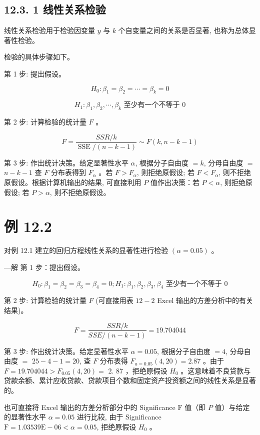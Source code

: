 \documentclass[10pt]{article}
\begin{document}
\begin{CJK*}{UTF8}{bsmi}
\subsection*{12.3. 1 线性关系检验}
线性关系检验用于检验因变量 $y$ 与 $k$ 个自变量之间的关系是否显著, 也称为总体显著性检验。

检验的具体步骤如下。

第 1 步: 提出假设。

$$
H_{0}: \beta_{1}=\beta_{2}=\cdots=\beta_{k}=0
$$

$$
H_{1}: \beta_{1}, \beta_{2}, \cdots, \beta_{k} \text { 至少有一个不等于 } 0
$$

第 2 步: 计算检验的统计量 $F$ 。


\begin{equation*}
F=\frac{S S R / k}{\operatorname{SSE} /(n-k-1)} \sim F(k, n-k-1) \tag{12.10}
\end{equation*}


第 3 步: 作出统计决策。给定显著性水平 $\alpha$, 根据分子自由度 $=k$, 分母自由度 $=$ $n-k-1$ 查 $F$ 分布表得到 $F_{\alpha}$ 。若 $F>F_{\alpha}$, 则拒绝原假设; 若 $F<F_{\alpha}$, 则不拒绝原假设。根据计算机输出的结果, 可直接利用 $P$ 值作出决策：若 $P<\alpha$, 则拒绝原假设; 若 $P>\alpha$, 则不拒绝原假设。

\section*{例 12.2}
对例 12.1 建立的回归方程线性关系的显著性进行检验 $(\alpha=0.05)$ 。

—解 第 1 步：提出假设。

$$
H_{0}: \beta_{1}=\beta_{2}=\beta_{3}=\beta_{4}=0 ; H_{1}: \beta_{1}, \beta_{2}, \beta_{3}, \beta_{4} \text { 至少有一个不等于 } 0
$$

第 2 步: 计算检验的统计量 $F$ (可直接用表 $12-2$ Excel 输出的方差分析中的有关结果)。

$$
F=\frac{S S R / k}{S S E /(n-k-1)}=19.704044
$$

第 3 步: 作出统计决策。给定显著性水平 $\alpha=0.05$, 根据分子自由度 $=4$, 分母自由度 $=$ $25-4-1=20$, 查 $F$ 分布表得 $F_{a=0.05}(4,20)=2.87$ 。由于 $F=19.704044>F_{0.05}(4,20)=$ 2. 87 ，拒绝原假设 $H_{0}$ 。这意味着不良贷款与贷款余额、累计应收贷款、贷款项目个数和固定资产投资额之间的线性关系是显著的。

也可直接将 Excel 输出的方差分析部分中的 Significance $\mathrm{F}$ 值（即 $P$ 值）与给定的显著性水平 $\alpha=0.05$ 进行比较, 由于 Significance $\mathrm{F}=1.03539 \mathrm{E}-06<\alpha=0.05$, 拒绝原假设 $H_{0}$ 。


\end{CJK*}
\end{document}

